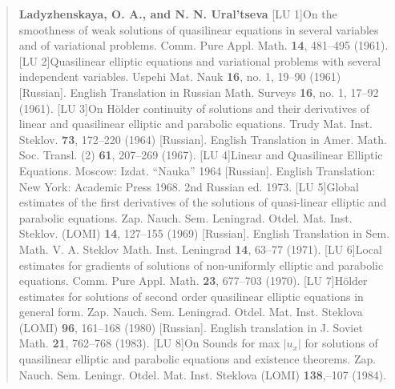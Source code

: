 \begin{quote}
\textbf{Ladyzhenskaya, O. A., and N. N. Ural'tseva}
\newline
{}[LU 1]\quad On the smoothness of weak solutions of quasilinear equations in several variables and of\newline
variational problems. Comm. Pure Appl. Math. \textbf{14}, 481--495 (1961).
\newline
{}[LU 2]\quad Quasilinear elliptic equations and variational problems with several independent variables.\newline
Uspehi Mat. Nauk \textbf{16}, no. 1, 19--90 (1961) [Russian]. English Translation in Russian Math.\newline
Surveys \textbf{16}, no. 1, 17--92 (1961).
\newline
{}[LU 3]\quad On H\"older continuity of solutions and their derivatives of linear and quasilinear elliptic\newline
and parabolic equations. Trudy Mat. Inst. Steklov. \textbf{73}, 172--220 (1964) [Russian]. English\newline
Translation in Amer. Math. Soc. Transl. (2) \textbf{61}, 207--269 (1967).
\newline
{}[LU 4]\quad Linear and Quasilinear Elliptic Equations. Moscow: Izdat. ``Nauka'' 1964 [Russian].\newline
English Translation: New York: Academic Press 1968. 2nd Russian ed. 1973.
\newline
{}[LU 5]\quad Global estimates of the first derivatives of the solutions of quasi-linear elliptic and parabolic\newline
equations. Zap. Nauch. Sem. Leningrad. Otdel. Mat. Inst. Steklov. (LOMI) \textbf{14}, 127--155\newline
(1969) [Russian]. English Translation in Sem. Math. V. A. Steklov Math. Inst. Leningrad\newline
\textbf{14}, 63--77 (1971).
\newline
{}[LU 6]\quad Local estimates for gradients of solutions of non-uniformly elliptic and parabolic equations.\newline
Comm. Pure Appl. Math. \textbf{23}, 677--703 (1970).
\newline
{}[LU 7]\quad H\"older estimates for solutions of second order quasilinear elliptic equations in general\newline
form. Zap. Nauch. Sem. Leningrad. Otdel. Mat. Inst. Steklova (LOMI) \textbf{96}, 161--168 (1980)\newline
{}[Russian]. English translation in J. Soviet Math. \textbf{21}, 762--768 (1983).
\newline
{}[LU 8]\quad On Sounds for max $|u_x|$ for solutions of quasilinear elliptic and parabolic equations and\newline
existence theorems. Zap. Nauch. Sem. Leningr. Otdel. Mat. Inst. Steklova (LOMI) \textbf{138},--107 (1984).


\end{quote}
